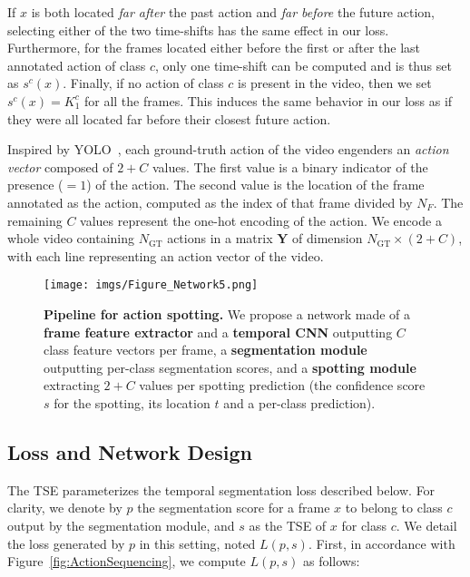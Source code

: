 \documentclass[10pt,twocolumn,letterpaper]{article}
\begin{document}
If $x$ is both located \emph{far after} the past action and \emph{far before} the future action, selecting either of the two time-shifts has the same effect in our loss. Furthermore, for the frames located either before the first or after the last annotated action of class $c$, only one time-shift can be computed and is thus set as $s^c(x)$. Finally, if no action of class $c$ is present in the video, then we set $s^c(x)=K^c_1$ for all the frames. This induces the same behavior in our loss as if they were all located far before their closest future action.



Inspired by YOLO~\cite{Redmon2016YOLO}, each ground-truth action of the video engenders an \emph{action vector} composed of $2+C$ values. The first value is a binary indicator of the presence ($=1$) of the action. The second value is the location of the frame annotated as the action, computed as the index of that frame divided by $N_F$. The remaining $C$ values represent the one-hot encoding of the action. We encode a whole video containing $N_\text{GT}$ actions in a matrix $\textbf{Y}$ of dimension $N_\text{GT}\times(2+C)$, with each line representing an action vector of the video.


\begin{figure}
    \centering
    \texttt{[image: imgs/Figure\_Network5.png]}
    \caption{
    \textbf{Pipeline for action spotting.}
    We propose a network made of
    a \textbf{\color{Orange}frame feature extractor} and a \textbf{\color{Orange} temporal CNN} outputting $C$ class feature vectors per frame,
    a \textbf{\color{NavyBlue}segmentation module} outputting per-class segmentation scores, and 
    a \textbf{\color{Green}spotting module} extracting $2+C$ values per spotting prediction (\ie the confidence score $s$ for the spotting, its location $t$ and a per-class prediction).
    }
    \label{fig:Network}
\end{figure}

\subsection{Loss and Network Design}

The TSE parameterizes the temporal segmentation loss described below. For clarity, we denote by $p$ the segmentation score for a frame $x$ to belong to class $c$ output by the segmentation module, and $s$ as the TSE of $x$ for class $c$. We detail the loss generated by $p$ in this setting, noted $L(p,s)$. First, in accordance with Figure~\ref{fig:ActionSequencing}, we compute $L(p,s)$ as follows:
\end{document}

